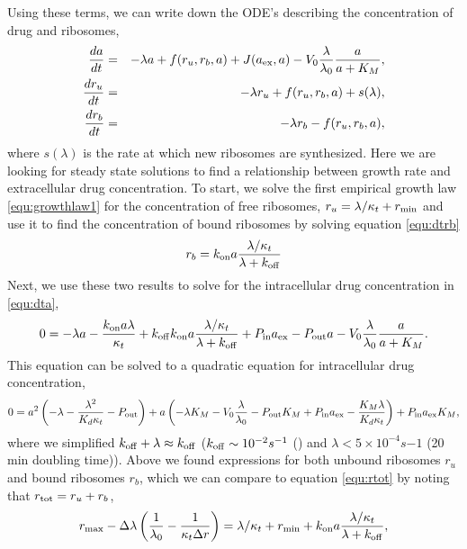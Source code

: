 Using these terms, we can write down the ODE's describing the concentration of drug and ribosomes,
\begin{eqnarray}
    {d a\over d t} &=& -\lambda a + f(r_u, r_b, a) + J(a_{\mathrm{ex}}, a) - V_0 {\lambda\over\lambda_0}{a\over a + K_M},\label{equ:dta}\\
    {dr_u\over dt} &=& -\lambda r_u + f(r_u, r_b, a) + s(\lambda),\label{equ:dtru}\\
    {dr_b\over dt} &=& -\lambda r_b - f(r_u, r_b, a)\label{equ:dtrb},
\end{eqnarray}
where $s(\lambda)$ is the rate at which new ribosomes are synthesized. Here we are looking for steady state solutions to find a relationship between growth rate and extracellular drug concentration.
To start, we solve the first empirical growth law \ref{equ:growthlaw1}  for the concentration of free ribosomes, $r_u = \lambda/\kappa_t + r_{\mathrm{min}}$ and use it to find the concentration of bound ribosomes by solving equation \ref{equ:dtrb}
\begin{equation}
    r_b = k_{\mathrm{on}}a{\lambda/\kappa_t \over \lambda + k_{\mathrm{off}} }
\end{equation}
Next, we use these two results to solve for the intracellular drug concentration in \ref{equ:dta},
\begin{equation}
    0=-\lambda a -\frac{k_{\mathrm{on}} a \lambda}{\kappa_t}+ k_{\mathrm{off}} k_{\mathrm{on}}a{\lambda/\kappa_t \over \lambda + k_{\mathrm{off}} }+ P_{\mathrm{in}} a_{\mathrm{ex}} - P_{\mathrm{out}} a - V_0 {\lambda \over \lambda_0} {a \over a + K_M}.
\end{equation}
This equation can be solved to a quadratic equation for intracellular drug concentration,
\begin{equation}
    0 = a^2 \left( -\lambda - \frac{\lambda^2}{K_d \kappa_t} - P_{\mathrm{out}} \right) + a \left(-\lambda K_M - V_0 {\lambda \over \lambda_0} - P_{\mathrm{out}} K_M + P_{\mathrm{in}} a_{\mathrm{ex}} - \frac{K_M \lambda}{K_d \kappa_t}\right) + P_{\mathrm{in}} a_{\mathrm{ex}} K_M,\label{equ:final_a}
\end{equation}
where we simplified $k_{\mathrm{off}} + \lambda \approx k_{\mathrm{off}}$ ($k_{\mathrm{off}}\sim 10^{-2} s^{-1}$ () and $\lambda < 5\times 10^{-4} s{-1}$ (20 min doubling time)). Above we found expressions for both unbound ribosomes $r_u$ and bound ribosomes $r_b$, which we can compare to equation \ref{equ:rtot} by noting that $r_{\mathrm{tot}} = r_u + r_b$,
\begin{equation}
    r_{\mathrm{max}} - \Delta \lambda \left( \frac{1}{\lambda_0} - \frac{1}{\kappa_t \Delta r} \right) = \lambda/\kappa_t + r_{\mathrm{min}} + k_{\mathrm{on}}a{\lambda/\kappa_t \over \lambda + k_{\mathrm{off}} },
\end{equation}
